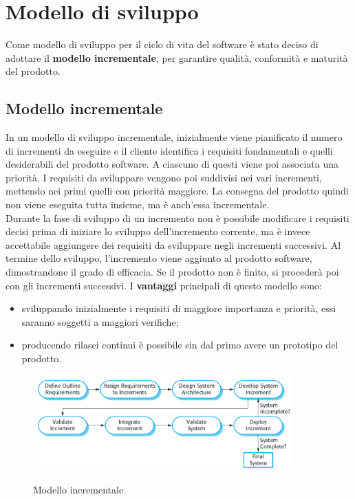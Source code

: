 \documentclass[PianoDiProgetto.tex]{subfiles}
\begin{document}
\chapter{Modello di sviluppo}
Come modello di sviluppo per il ciclo di vita del software è stato deciso di adottare il \textbf{modello incrementale}, per garantire qualità, conformità e maturità del prodotto.

\section{Modello incrementale}
In un modello di sviluppo incrementale, inizialmente viene pianificato il numero di incrementi da eseguire e il cliente identifica i requisiti fondamentali e quelli desiderabili del prodotto software. A ciascuno di questi viene poi associata una priorità. I requisiti da sviluppare vengono poi suddivisi nei vari incrementi, mettendo nei primi quelli con priorità maggiore. La consegna del prodotto quindi non viene eseguita tutta insieme, ma è anch'essa incrementale.\\
Durante la fase di sviluppo di un incremento non è possibile modificare i requisiti decisi prima di iniziare lo sviluppo dell'incremento corrente, ma è invece accettabile aggiungere dei requisiti da sviluppare negli incrementi successivi. Al termine dello sviluppo, l'incremento viene aggiunto al prodotto software, dimostrandone il grado di efficacia. Se il prodotto non è finito, si procederà poi con gli incrementi successivi. I \textbf{vantaggi} principali di questo modello sono:
\begin{itemize}
	\item sviluppando inizialmente i requisiti di maggiore importanza e priorità, essi saranno soggetti a maggiori verifiche;
	\item producendo rilasci continui è possibile sin dal primo avere un prototipo del prodotto.
\end{itemize}

\begin{figure}[h] %
	\centering
	\includegraphics[width=10cm]{images/modIncrementale.png}
	\label{fig:foo}
	\caption{Modello incrementale}
\end{figure} 
\end{document}
